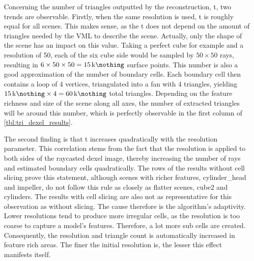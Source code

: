 %
Concerning the number of triangles outputted by the reconstruction, t, two trends are observable.
Firstly, when the same resolution is used, t is roughly equal for all scenes.
This makes sense, as the t does not depend on the amount of triangles needed by the VML to describe the scene.
Actually, only the shape of the scene has an impact on this value.
Taking a perfect cube for example and a resolution of 50, each of the six cube side would be sampled by $50\times50$ rays, resulting in $6 \times 50 \times 50 = \SI{15}{\kilo\nothing}$ surface points.
This number is also a good approximation of the number of boundary cells.
Each boundary cell then contains a loop of 4 vertices, triangulated into a fan with 4 triangles, yielding $\SI{15}{\kilo\nothing} \times 4 = \SI{60}{\kilo\nothing}$ total triangles.
Depending on the feature richness and size of the scene along all axes, the number of extracted triangles will be around this number, which is perfectly observable in the first column of \cref{tbl:tri_dexel_results}.

The second finding is that t increases quadratically with the resolution parameter.
This correlation stems from the fact that the resolution is applied to both sides of the raycasted dexel image, thereby increasing the number of rays and estimated boundary cells quadratically.
The rows of the results without cell slicing prove this statement, although scenes with richer features, \eg cylinder\_head and impeller, do not follow this rule as closely as flatter scenes, \eg cube2 and cylinders.
The results with cell slicing are also not as representative for this observation as without slicing.
The cause therefore is the algorithm's adaptivity.
Lower resolutions tend to produce more irregular cells, as the resolution is too coarse to capture a model's features.
Therefore, a lot more sub cells are created.
Consequently, the resolution and triangle count is automatically increased in feature rich areas.
The finer the initial resolution is, the lesser this effect manifests itself.


